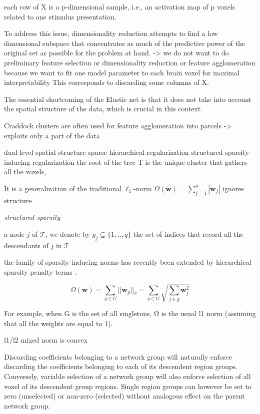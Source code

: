 \documentclass{article} %
\begin{document}
each row of X is a p-dimensional sample,
i.e., an activation map of p voxels related to one stimulus presentation.

To address this issue, dimensionality reduction attempts to
find a low dimensional subspace that concentrates
as much of the predictive power of
the original set as possible for the problem at hand.
-> we do not want to do preliminary feature selection or
dimensionality reduction
or feature agglomeration because we want to fit one model parameter
to each brain voxel for maximal interpretability
This corresponds to discarding some columns of X.

The essential shortcoming of the Elastic net is that
it does not take into account the spatial structure of the data,
which is crucial in this context

Craddock clusters are often used for feature agglomeration
into parcels
-> exploits only a part of the data

dual-level spatial structure
sparse hierarchical regularization
structured sparsity-inducing regularization
the root of the tree T is the unique cluster that gathers all the voxels,

It is a generalization of the traditional $\ell_1$-norm
$\Omega(\mathbf{w}) = \sum_{j=1}^p|\mathbf{w}_j|$
ignores structure


\cite{jenatton2011multi}

\textit{structured sparsity}

\cite{huang2011learning, morales2010family, jenatton2011structured}


a node $j$ of $\mathcal{T}$,
we denote by $g_j \subseteq \{1,..,q\}$ the set of indices that record
all the descendants of $j$ in $\mathcal{T}$

the family of sparsity-inducing norms has recently been extended
by hierarchical sparsity penalty terms
\cite{zhao2009composite}.


\begin{equation}
  \Omega(\mathbf{w}) = \sum_{g \in G}||\mathbf{w}_g||_2 = \sum_{g \in G}\sqrt{\sum_{j \in g}\mathbf{w}_j^2}
\end{equation}

For example, when G is the set of all singletons, Ω is the
usual l1 norm (assuming that all the weights are equal to 1).

l1/l2 mixed norm is convex


Discarding coefficients belonging to a network group will naturally enforce
discarding the coefficients belonging to each of its descendent region groups.
Conversely,
variable selection of a network group will also enforce
selection of all voxel of its descendent group regions.
Single region groups can however be set to zero (unselected)
or non-zero (selected)
without analogous effect on the parent network group.
\end{document}
